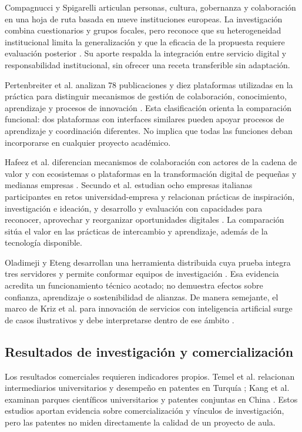 \documentclass[12pt,twocolumn]{article}
\begin{document}
Compagnucci y Spigarelli articulan personas, cultura, gobernanza y colaboración en una hoja de ruta basada en nueve instituciones europeas. La investigación combina cuestionarios y grupos focales, pero reconoce que su heterogeneidad institucional limita la generalización y que la eficacia de la propuesta requiere evaluación posterior \cite{compagnucci2024}. Su aporte respalda la integración entre servicio digital y responsabilidad institucional, sin ofrecer una receta transferible sin adaptación.

Pertenbreiter et al. analizan 78 publicaciones y diez plataformas utilizadas en la práctica para distinguir mecanismos de gestión de colaboración, conocimiento, aprendizaje y procesos de innovación \cite{pertenbreiter2026}. Esta clasificación orienta la comparación funcional: dos plataformas con interfaces similares pueden apoyar procesos de aprendizaje y coordinación diferentes. No implica que todas las funciones deban incorporarse en cualquier proyecto académico.

Hafeez et al. diferencian mecanismos de colaboración con actores de la cadena de valor y con ecosistemas o plataformas en la transformación digital de pequeñas y medianas empresas \cite{hafeez2025}. Secundo et al. estudian ocho empresas italianas participantes en retos universidad-empresa y relacionan prácticas de inspiración, investigación e ideación, y desarrollo y evaluación con capacidades para reconocer, aprovechar y reorganizar oportunidades digitales \cite{secundo2026}. La comparación sitúa el valor en las prácticas de intercambio y aprendizaje, además de la tecnología disponible.

Oladimeji y Eteng desarrollan una herramienta distribuida cuya prueba integra tres servidores y permite conformar equipos de investigación \cite{oladimeji2022}. Esa evidencia acredita un funcionamiento técnico acotado; no demuestra efectos sobre confianza, aprendizaje o sostenibilidad de alianzas. De manera semejante, el marco de Kriz et al. para innovación de servicios con inteligencia artificial surge de casos ilustrativos y debe interpretarse dentro de ese ámbito \cite{kriz2026}.

\subsection{Resultados de investigación y comercialización}
Los resultados comerciales requieren indicadores propios. Temel et al. relacionan intermediarios universitarios y desempeño en patentes en Turquía \cite{temel2021}; Kang et al. examinan parques científicos universitarios y patentes conjuntas en China \cite{kang2025}. Estos estudios aportan evidencia sobre comercialización y vínculos de investigación, pero las patentes no miden directamente la calidad de un proyecto de aula.
\end{document}
